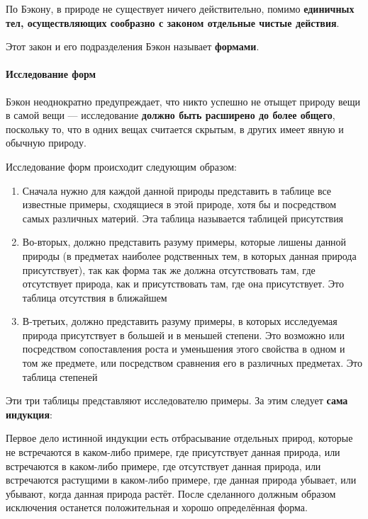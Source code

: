 \documentclass{article}
\begin{document}
\begin{flushleft}
По Бэкону, в природе не существует ничего действительно, помимо \textbf{единичных тел, осуществляющих сообразно с законом отдельные чистые действия}.

Этот закон и его подразделения Бэкон называет \textbf{формами}.

\paragraph{Исследование форм}

Бэкон неоднократно предупреждает, что никто успешно не отыщет природу вещи в самой вещи — исследование \textbf{должно быть расширено до более общего}, поскольку то, что в одних вещах считается скрытым, в других имеет явную и обычную природу.

Исследование форм происходит следующим образом:

\begin{enumerate}
    \item Сначала нужно для каждой данной природы представить в таблице все известные примеры, сходящиеся в этой природе, хотя бы и посредством самых различных материй. Эта таблица называется таблицей присутствия
    \item Во-вторых, должно представить разуму примеры, которые лишены данной природы (в предметах наиболее родственных тем, в которых данная природа присутствует), так как форма так же должна отсутствовать там, где отсутствует природа, как и присутствовать там, где она присутствует. Это таблица отсутствия в ближайшем
    \item В-третьих, должно представить разуму примеры, в которых исследуемая природа присутствует в большей и в меньшей степени. Это возможно или посредством сопоставления роста и уменьшения этого свойства в одном и том же предмете, или посредством сравнения его в различных предметах. Это таблица степеней
\end{enumerate}

Эти три таблицы представляют исследователю примеры. За этим следует \textbf{сама индукция}:

\begin{displayquote}
Первое дело истинной индукции есть отбрасывание отдельных природ, которые не встречаются в каком-либо примере, где присутствует данная природа, или встречаются в каком-либо примере, где отсутствует данная природа, или встречаются растущими в каком-либо примере, где данная природа убывает, или убывают, когда данная природа растёт. После сделанного должным образом исключения останется положительная и хорошо определённая форма.
\end{displayquote}


\end{flushleft}
\end{document}
